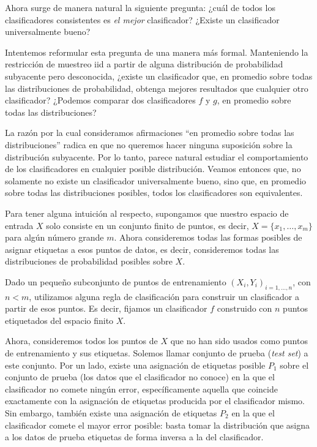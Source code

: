 \documentclass{article}
\begin{document}
Ahora surge de manera natural la siguiente pregunta: ¿cuál de todos los clasificadores consistentes 
es \textit{el mejor} clasificador? ¿Existe un clasificador universalmente bueno?\newline

Intentemos reformular esta pregunta de una manera más formal. Manteniendo la restricción de muestreo iid
a partir de alguna distribución de probabilidad subyacente pero desconocida, ¿existe 
un clasificador que, en promedio sobre todas las distribuciones de probabilidad, obtenga mejores 
resultados que cualquier otro clasificador? ¿Podemos comparar dos clasificadores \(f\) y \(g\), 
en promedio sobre todas las distribuciones?\newline

La razón por la cual consideramos afirmaciones ``en promedio sobre todas las distribuciones'' radica 
en que no queremos hacer ninguna suposición sobre la distribución subyacente. Por lo tanto, parece 
natural estudiar el comportamiento de los clasificadores en cualquier posible distribución. Veamos entonces
que, no solamente no existe un clasificador universalmente bueno, sino que, en promedio sobre todas las distribuciones
posibles, todos los clasificadores son equivalentes.\newline

Para tener alguna intuición al respecto, supongamos que nuestro espacio de entrada \(X\) solo consiste en un conjunto finito de puntos, es decir, 
\(X = \{x_1, \dots, x_m\}\) para algún número grande \(m\). Ahora consideremos todas las formas 
posibles de asignar etiquetas a esos puntos de datos, es decir, consideremos todas las distribuciones 
de probabilidad posibles sobre \(X\). \newline

Dado un pequeño subconjunto de puntos de entrenamiento \((X_i, Y_i)_{i=1,\dots,n}\), con $n<m$, utilizamos 
alguna regla de clasificación para construir un clasificador a partir de esos puntos. Es decir, fijamos un clasificador $f$
construido con $n$ puntos etiquetados del espacio finito \(X\).\newline

Ahora, consideremos todos los puntos de \(X\) que no han sido usados como 
puntos de entrenamiento y sus etiquetas. Solemos llamar conjunto de prueba (\textit{test set}) a este conjunto.
Por un lado, existe una asignación de etiquetas posible \(P_1\) sobre el conjunto de prueba (los datos que el clasificador
no conoce) en la que el 
clasificador no comete ningún error, específicamente aquella que coincide exactamente con la asignación 
de etiquetas producida por el clasificador mismo. Sin embargo, también existe una asignación de 
etiquetas \(P_2\) en la que el clasificador comete el mayor error posible: basta tomar la distribución
que asigna a los datos de prueba etiquetas de forma inversa a la del clasificador. \newline
\end{document}
